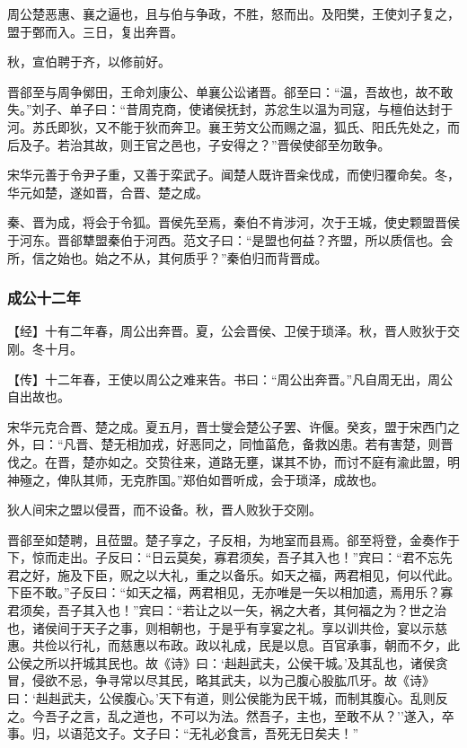 \documentclass[]{article}
\begin{document}
周公楚恶惠、襄之逼也，且与伯与争政，不胜，怒而出。及阳樊，王使刘子复之，盟于鄄而入。三日，复出奔晋。

秋，宣伯聘于齐，以修前好。

晋郤至与周争鄇田，王命刘康公、单襄公讼诸晋。郤至曰：``温，吾故也，故不敢失。''刘子、单子曰：``昔周克商，使诸侯抚封，苏忿生以温为司寇，与檀伯达封于河。苏氏即狄，又不能于狄而奔卫。襄王劳文公而赐之温，狐氏、阳氏先处之，而后及子。若治其故，则王官之邑也，子安得之？''晋侯使郤至勿敢争。

宋华元善于令尹子重，又善于栾武子。闻楚人既许晋籴伐成，而使归覆命矣。冬，华元如楚，遂如晋，合晋、楚之成。

秦、晋为成，将会于令狐。晋侯先至焉，秦伯不肯涉河，次于王城，使史颗盟晋侯于河东。晋郤犨盟秦伯于河西。范文子曰：``是盟也何益？齐盟，所以质信也。会所，信之始也。始之不从，其何质乎？''秦伯归而背晋成。

\hypertarget{header-n1683}{%
\subsubsection{成公十二年}\label{header-n1683}}

【经】十有二年春，周公出奔晋。夏，公会晋侯、卫侯于琐泽。秋，晋人败狄于交刚。冬十月。

【传】十二年春，王使以周公之难来告。书曰：``周公出奔晋。''凡自周无出，周公自出故也。

宋华元克合晋、楚之成。夏五月，晋士燮会楚公子罢、许偃。癸亥，盟于宋西门之外，曰：``凡晋、楚无相加戎，好恶同之，同恤菑危，备救凶患。若有害楚，则晋伐之。在晋，楚亦如之。交贽往来，道路无壅，谋其不协，而讨不庭有渝此盟，明神殛之，俾队其师，无克胙国。''郑伯如晋听成，会于琐泽，成故也。

狄人间宋之盟以侵晋，而不设备。秋，晋人败狄于交刚。

晋郤至如楚聘，且莅盟。楚子享之，子反相，为地室而县焉。郤至将登，金奏作于下，惊而走出。子反曰：``日云莫矣，寡君须矣，吾子其入也！''宾曰：``君不忘先君之好，施及下臣，贶之以大礼，重之以备乐。如天之福，两君相见，何以代此。下臣不敢。''子反曰：``如天之福，两君相见，无亦唯是一矢以相加遗，焉用乐？寡君须矣，吾子其入也！''宾曰：``若让之以一矢，祸之大者，其何福之为？世之治也，诸侯间于天子之事，则相朝也，于是乎有享宴之礼。享以训共俭，宴以示慈惠。共俭以行礼，而慈惠以布政。政以礼成，民是以息。百官承事，朝而不夕，此公侯之所以扞城其民也。故《诗》曰：`赳赳武夫，公侯干城。'及其乱也，诸侯贪冒，侵欲不忌，争寻常以尽其民，略其武夫，以为己腹心股肱爪牙。故《诗》曰：`赳赳武夫，公侯腹心。'天下有道，则公侯能为民干城，而制其腹心。乱则反之。今吾子之言，乱之道也，不可以为法。然吾子，主也，至敢不从？''遂入，卒事。归，以语范文子。文子曰：``无礼必食言，吾死无日矣夫！''
\end{document}
